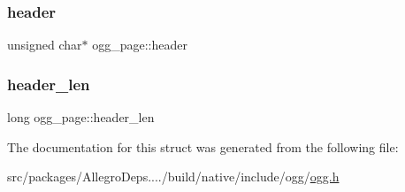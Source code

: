 \mbox{\label{structogg__page_a9f251dc1a96fbfd84ff2585fbbc03c16}} 
\subsubsection{\texorpdfstring{header}{header}}
{\footnotesize\ttfamily unsigned char$\ast$ ogg\+\_\+page\+::header}

\mbox{\label{structogg__page_aeaa6edc2ff9f2c5cc8f0ecf001936b7b}} 
\subsubsection{\texorpdfstring{header\+\_\+len}{header\_len}}
{\footnotesize\ttfamily long ogg\+\_\+page\+::header\+\_\+len}



The documentation for this struct was generated from the following file\+:\begin{DoxyCompactItemize}
\item 
src/packages/\+Allegro\+Deps..../build/native/include/ogg/\hyperlink{ogg_8h}{ogg.\+h}\end{DoxyCompactItemize}

